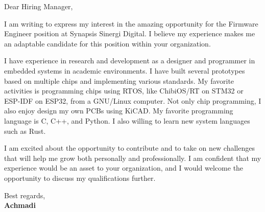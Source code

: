 \documentclass[a4paper,11pt]{letter}
\begin{document}

\normalsize Dear Hiring Manager,

\small \noindent
I am writing to express my interest in the amazing opportunity for the Firmware Engineer position at Synapsis Sinergi Digital.
I believe my experience makes me an adaptable candidate for this position within your organization.

\vspace{1pt}
I have experience in research and development as a designer and programmer in embedded systems in academic environments.
I have built several prototypes based on multiple chips and implementing various standards.
My favorite activities is programming chips using RTOS, like ChibiOS/RT on STM32 or ESP-IDF on ESP32, from a GNU/Linux computer.
Not only chip programming, I also enjoy design my own PCBs using KiCAD.
My favorite programming language is C, C++, and Python.
I also willing to learn new system languages such as Rust.


\vspace{1pt}
I am excited about the opportunity to contribute and to take on new challenges that will help me grow both personally and professionally.
I am confident that my experience would be an asset to your organization, and I would welcome the opportunity to discuss my qualifications further.

\bigskip
\noindent
Best regards,\\
\textbf{Achmadi}
\end{document}
